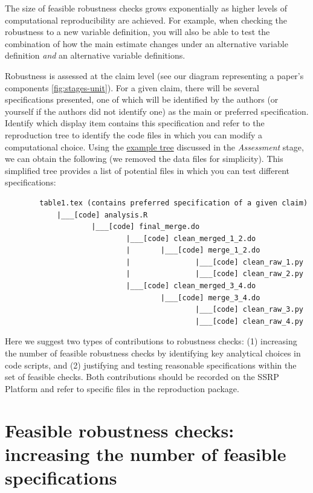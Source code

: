 \documentclass[
]{book}
\begin{document}
The size of feasible robustness checks grows exponentially as higher levels of computational reproducibility are achieved. For example, when checking the robustness to a new variable definition, you will also be able to test the combination of how the main estimate changes under an alternative variable definition \emph{and} an alternative variable definitions.

Robustness is assessed at the claim level (see our diagram representing a paper's components \ref{fig:stages-unit}). For a given claim, there will be several specifications presented, one of which will be identified by the authors (or yourself if the authors did not identify one) as the main or preferred specification. Identify which display item contains this specification and refer to the reproduction tree to identify the code files in which you can modify a computational choice. Using the \protect\hyperlink{complete-tree}{example tree} discussed in the \emph{Assessment} stage, we can obtain the following (we removed the data files for simplicity). This simplified tree provides a list of potential files in which you can test different specifications:

\begin{verbatim}
        table1.tex (contains preferred specification of a given claim)
            |___[code] analysis.R
                    |___[code] final_merge.do
                            |___[code] clean_merged_1_2.do
                            |       |___[code] merge_1_2.do
                            |               |___[code] clean_raw_1.py
                            |               |___[code] clean_raw_2.py
                            |___[code] clean_merged_3_4.do
                                    |___[code] merge_3_4.do
                                            |___[code] clean_raw_3.py
                                            |___[code] clean_raw_4.py
\end{verbatim}

Here we suggest two types of contributions to robustness checks: (1) increasing the number of feasible robustness checks by identifying key analytical choices in code scripts, and (2) justifying and testing reasonable specifications within the set of feasible checks. Both contributions should be recorded on the SSRP Platform and refer to specific files in the reproduction package.

\hypertarget{feasible-robustness-checks-increasing-the-number-of-feasible-specifications}{%
\section{Feasible robustness checks: increasing the number of feasible specifications}\label{feasible-robustness-checks-increasing-the-number-of-feasible-specifications}}
\end{document}
